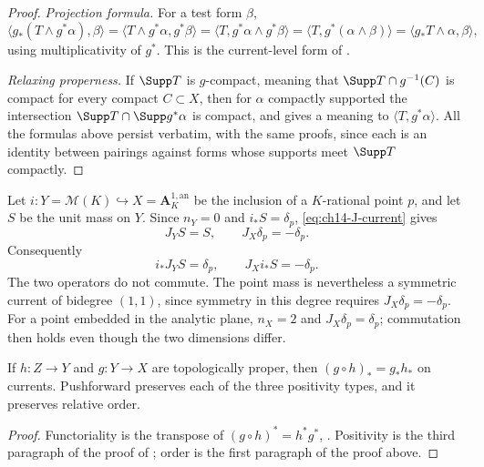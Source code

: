 \begin{proof}
\emph{Projection formula.}  For a test form $\beta$,
\[
 \langle g_*(T\wedge g^*\alpha),\beta\rangle
 =\langle T\wedge g^*\alpha,g^*\beta\rangle
 =\langle T,g^*\alpha\wedge g^*\beta\rangle
 =\langle T,g^*(\alpha\wedge\beta)\rangle
 =\langle g_*T\wedge\alpha,\beta\rangle,
\]
using multiplicativity of $g^*$.  This is the current-level form of
.

\emph{Relaxing properness.}  If $\Supp T$ is $g$-compact, meaning that
$\Supp T\cap g^{-1}(C)$ is compact for every compact $C\subset X$, then for
$\alpha$ compactly supported the intersection
$\Supp T\cap\Supp g^*\alpha$ is compact, and
 gives a meaning to
$\langle T,g^*\alpha\rangle$.  All the formulas above persist verbatim, with
the same proofs, since each is an identity between pairings against forms
whose supports meet $\Supp T$ compactly.
\end{proof}

\begin{example}
\label{ex:ch14-pushforward-J-sign}
Let $i:Y=\mathcal M(K)\hookrightarrow X=\mathbf A_K^{1,\mathrm{an}}$
be the inclusion of a $K$-rational point $p$, and let $S$ be the
unit mass on $Y$.  Since $n_Y=0$ and $i_*S=\delta_p$,
\eqref{eq:ch14-J-current} gives
\[
       J_YS=S,\qquad J_X\delta_p=-\delta_p .
\]
Consequently
\[
                 i_*J_YS=\delta_p,\qquad J_Xi_*S=-\delta_p .
\]
The two operators do not commute.  The point mass is nevertheless a
symmetric current of bidegree $(1,1)$, since symmetry in this degree
requires $J_X\delta_p=-\delta_p$.  For a point embedded in the analytic
plane, $n_X=2$ and $J_X\delta_p=\delta_p$; commutation then holds even
though the two dimensions differ.
\end{example}


\begin{corollary}
\label{cor:ch14-pushforward-functorial}
If $h:Z\to Y$ and $g:Y\to X$ are topologically proper, then
$(g\circ h)_*=g_*h_*$ on currents.  Pushforward preserves each of the three
positivity types, and it preserves relative order.
\end{corollary}

\begin{proof}
Functoriality is the transpose of $(g\circ h)^*=h^*g^*$,
.  Positivity is the third paragraph of the
proof of ; order is the first
paragraph of the proof above.
\end{proof}

